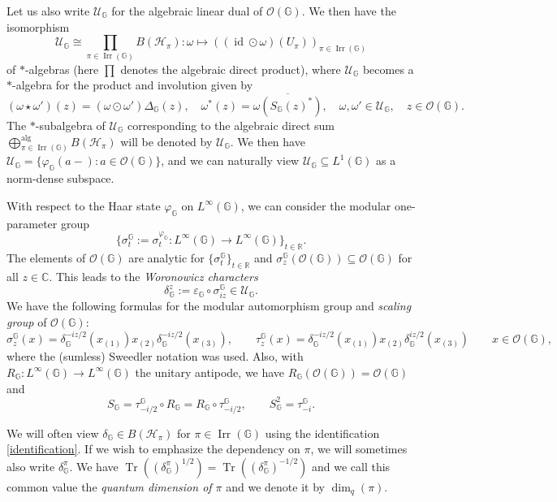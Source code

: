 \documentclass[reqno]{amsart}
\numberwithin{equation}{section}
\DeclareMathOperator{\id}{\mathrm{id}}
\DeclareMathOperator{\Irr}{\mathrm{Irr}}
\newcommand{\msU}{\mathscr{U}}
\newcommand{\mcH}{\mathcal{H}}
\newcommand{\mcO}{\mathcal{O}}
\newcommand{\C}{\mathbb{C}}
\newcommand{\G}{\mathbb{G}}
\newcommand{\mH}{\mathcal{H}}
\begin{document}
Let us also write $\mathscr{U}_\G$ for the algebraic linear dual of $\mcO(\G)$. We then have the isomorphism
\begin{equation}\label{identification}
    \mathscr{U}_\G\cong \prod_{\pi \in \Irr(\G)} B(\mcH_\pi): \omega \mapsto ((\id \odot \omega)(U_\pi))_{\pi \in \Irr(\G)}
\end{equation}
of $*$-algebras (here $\prod$ denotes the algebraic direct product), where $\mathscr{U}_\G$ becomes a $*$-algebra for the product and involution given by 
$$(\omega \star \omega')(z)= (\omega \odot \omega')\Delta_{\G}(z), \quad \omega^*(z)= \overline{\omega(S_{\G}(z)^*)}, \quad \omega, \omega'\in \mathscr{U}_{\G}, \quad z \in \mcO(\G).$$
The $*$-subalgebra of $\mathscr{U}_\G$ corresponding to the algebraic direct sum $\bigoplus_{\pi\in \Irr(\G)}^{\operatorname{alg}} B(\mcH_\pi)$ will be denoted by $\mathcal{U}_\G$. We then have $\mathcal{U}_\G=\{\varphi_\G(a-): a \in \mcO(\G)\}$, and we can naturally view $\mathcal{U}_\G\subseteq L^1(\G)$ as a norm-dense subspace.

With respect to the Haar state $\varphi_\G$ on $L^\infty(\G)$, we can consider the modular one-parameter group $$\{\sigma_t^\G:= \sigma_t^{\varphi_\G}: L^\infty(\G)\to L^\infty(\G)\}_{t\in \mathbb{R}}.$$ The elements of $\mathcal{O}(\G)$ are analytic for $\{\sigma_t^\G\}_{t\in \mathbb{R}}$ and $\sigma_z^\G(\mathcal{O}(\G)) \subseteq \mathcal{O}(\G)$ for all $z\in \C$. This leads to the \emph{Woronowicz characters} 
\begin{equation}\label{DefWorChar}
\delta^z_\G := \varepsilon_\G \circ \sigma_{iz}^\G \in \msU_\G.
\end{equation}
We have the following formulas for the modular automorphism group and \emph{scaling group} of $\mathcal{O}(\G)$:
\begin{equation}\label{EqFormSigmaScaling}
\sigma_{z}^\G(x) =  \delta^{-iz/2}_\G(x_{(1)})x_{(2)}\delta^{-iz/2}_\G(x_{(3)}),\qquad \tau_{z}^\G(x) =  \delta^{-iz/2}_\G(x_{(1)})x_{(2)}\delta^{iz/2}_\G(x_{(3)})\qquad x\in \mathcal{O}(\G),
\end{equation}
where the (sumless)  Sweedler notation was used. Also, with $R_\G: L^\infty(\G)\to L^\infty(\G)$ the unitary antipode, we have $R_\G(\mathcal{O}(\G))= \mathcal{O}(\G)$ and  
\begin{equation}
S_\G = \tau_{-i/2}^\G\circ R_\G = R_\G\circ \tau_{-i/2}^\G,\qquad S_\G^2 = \tau_{-i}^\G. 
\end{equation}

We will often view 
$\delta_\G\in  B(\mH_\pi)$ for $\pi\in \Irr(\G)$ using the identification \eqref{identification}.  If we wish to emphasize the dependency on $\pi$, we will sometimes also write $\delta_\G^\pi$. We have $\operatorname{Tr}((\delta_\G^{\pi})^{1/2})= \operatorname{Tr}((\delta_\G^{\pi})^{-1/2})$ and we call this common value the \emph{quantum dimension of $\pi$} and we denote it by $\dim_q(\pi)$. 
\end{document}
